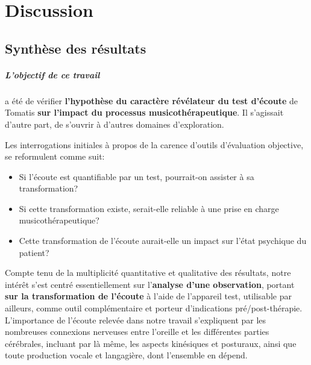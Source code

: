 
\chapter{Discussion}
\label{Conclusions}
\section{Synthèse des résultats}

\paragraph{L'objectif de ce travail} a été de vérifier\textbf{ l'hypothèse du caractère
révélateur du test
d'écoute }de Tomatis \textbf{ sur l'impact du processus musicothérapeutique}.
Il s'agissait d'autre part, de s'ouvrir à d'autres
domaines d'exploration.

Les interrogations initiales à propos de la carence d'outils d'évaluation objective, se
reformulent comme suit:
\begin{itemize}
     \item
       Si l'écoute est quantifiable  par un test, pourrait-on assister à sa
transformation?
\item Si cette transformation existe, serait-elle reliable à
une prise en charge musicothérapeutique?
\item Cette transformation de l'écoute aurait-elle un impact sur l'état
psychique du patient? %
\end{itemize}



  Compte tenu de la multiplicité quantitative et qualitative des
  résultats, notre intérêt s'est centré essentiellement sur l'\textbf{analyse d'une
  observation}, portant \textbf{sur la transformation de l'écoute} à l'aide de
  l'appareil test, utilisable par ailleurs, comme outil complémentaire
  et porteur d'indications pré/post-thérapie.
  L'importance de l'écoute relevée dans notre travail
  s'expliquent par les nombreuses connexions nerveuses entre l'oreille et les
  différentes parties cérébrales, incluant par là même, les aspects kinésiques
  et posturaux, ainsi que toute production vocale et langagière,
  dont l'ensemble en dépend.



